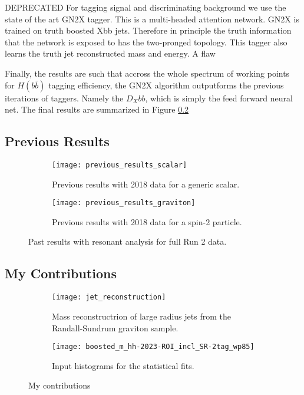 \documentclass[12pt]{article}
\begin{document}
\vspace{10pt}
DEPRECATED
For tagging signal and discriminating background we use the state of the art
GN2X tagger. This is a multi-headed attention network. GN2X\* is trained on
truth boosted Xbb jets. Therefore in principle the truth information that the
network is exposed to has the two-pronged topology. This tagger also learns the
truth jet reconstructed mass and energy. A flaw 

Finally, the results are such that accross the whole spectrum of working points
for $H(b\bar{b})$ tagging efficiency, the GN2X algorithm outputforms the
previous iterations of taggers. Namely the $D_Xbb$, which is simply the feed
forward neural net. The final results are summarized in Figure \ref{}

\newpage
\subsection{Previous Results}
\begin{figure}[t]
    \centering
    \begin{subfigure}[t]{.48\textwidth}
        \centering
        \texttt{[image: previous\_results\_scalar]}
        \caption{Previous results with 2018 data for a generic scalar.}
        \label{subfig:previous_results_scalar}
    \end{subfigure}
    \hfill
    \begin{subfigure}[t]{.48\textwidth}
        \centering
        \texttt{[image: previous\_results\_graviton]}
        \caption{Previous results with 2018 data for a spin-2 particle.}
        \label{subfig:previous_results_graviton}
    \end{subfigure}
\caption{Past results with resonant analysis for full Run 2 data.}
\label{fig:previous_results}
\end{figure}



\newpage
\subsection{My Contributions}

\begin{figure}[t]
    \centering
    \begin{subfigure}[t]{.48\textwidth}
        \centering
        \texttt{[image: jet\_reconstruction]}
        \caption{Mass reconstructrion of large radius jets from the Randall-Sundrum graviton sample.}
        \label{subfig:jet_reconstruction}
    \end{subfigure}
    \hfill
    \begin{subfigure}[t]{.48\textwidth}
        \centering
        \texttt{[image: boosted\_m\_hh-2023-ROI\_incl\_SR-2tag\_wp85]}
        \caption{Input histograms for the statistical fits.}
        \label{subfig:input_hists}
    \end{subfigure}
\caption{My contributions}
\label{fig:my_contributions}
\end{figure}
\end{document}
